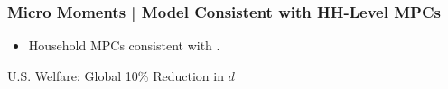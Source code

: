 \documentclass[9pt,pdftex,aspectratio=1610]{beamer}
\theoremstyle{definition}
\begin{document}
\begin{frame}[t]
\frametitle{Micro Moments | Model Consistent with HH-Level MPCs}
\begin{figure}[!t]
\end{figure}
\begin{itemize}
\smallskip
\item Household MPCs consistent with \citet{kaplan2022marginal}.
\end{itemize}
\end{frame}



\begin{frame}[t]{U.S. Welfare: Global 10\% Reduction in $d$ }
\begin{figure}[!t]
\end{figure}
\end{frame}
\end{document}
